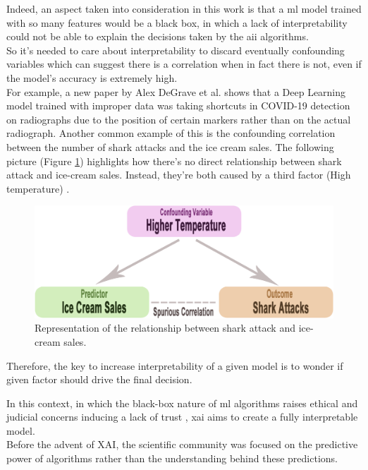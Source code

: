 Indeed, an aspect taken into consideration in this work is that a \acrshort{ml} model trained with so many features would be a black box, in which a lack of interpretability could not be able to explain the decisions taken by the \gls{aii} algorithms.\\
So it's needed to care about interpretability to discard eventually confounding variables which can suggest there is a correlation when in fact there is not, even if the model's accuracy is extremely high.\\
For example, a new paper by Alex DeGrave et al. \cite{degrave2021ai} shows that a Deep Learning model trained with improper data was taking shortcuts in COVID-19 detection on radiographs due to the position of certain markers rather than on the actual radiograph.
Another common example of this is the confounding correlation between the number of shark attacks and the ice cream sales. 
The following picture (Figure \ref{fig:shark}) \cite{shark-icecream} highlights how there's no direct relationship between shark attack and ice-cream sales. Instead, they're both caused by a third factor (High temperature) \cite{siegel2019ice}.\newline
\begin{figure}[H]
    \centering
    \includegraphics[scale=0.25]{images/confounding.png}
    \caption{Representation of the relationship between shark attack and ice-cream sales.}
    \label{fig:shark}
\end{figure}
Therefore, the key to increase interpretability of a given model is to wonder if given factor should drive the final decision.\par
In this context, in which the black-box nature of \acrshort{ml} algorithms raises ethical and judicial concerns inducing a lack of trust \cite{9141213}, \gls{xai} aims to create a fully interpretable model.\\
Before the advent of XAI, the scientific community was focused on the predictive power of algorithms rather than the understanding behind these predictions.\\
